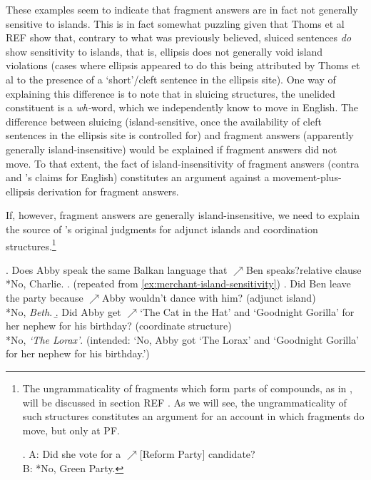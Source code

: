 \documentclass[11pt,letterpaper]{article}
\begin{document}
%
% 
		
These examples seem to indicate that fragment answers are in fact not generally sensitive to islands. This is in fact somewhat puzzling given that Thoms et al REF %
show that, contrary to what was previously believed, sluiced sentences \emph{do} show sensitivity to islands, that is, ellipsis does not generally void island violations (cases where ellipsis appeared to do this being attributed by Thoms et al %
to the presence of a `short'/cleft sentence in the ellipsis site). One way of explaining this difference is to note that in sluicing structures, the unelided constituent is a {\it wh-}word, which we independently know to move in English. The difference between sluicing (island-sensitive, once the availability of cleft sentences in the ellipsis site is controlled for) and fragment answers (apparently generally island-insensitive) would be explained if fragment answers did not move. To that extent, the fact of island-insensitivity of fragment answers (contra \cite{Me04} and \cite{Te13}'s claims for English) constitutes an argument against a movement-plus-ellipsis derivation for fragment answers. %

If, however, fragment answers are generally island-insensitive, we need to explain the source of \cite{Me04}'s original judgments for adjunct islands and coordination structures.\footnote{The ungrammaticality of fragments which form parts of compounds, as in \Next, will be discussed in section REF %
. As we will see, the ungrammaticality of such structures constitutes an argument for an account in which fragments do move, but only at PF.

\ex.	A: Did she vote for a $\nearrow$[Reform Party] candidate?\\
	B: *No, Green Party.
	
}

\ex. 	Does Abby speak the same Balkan language that $\nearrow$Ben speaks?\hfill{relative clause}\\
	{}*No, Charlie.
\ex. 	(repeated from \ref{ex:merchant-island-sensitivity})
	\a. Did Ben leave the party because $\nearrow$Abby wouldn't dance with him? \hfill (adjunct island)\\
	{}*No, \emph{Beth}.
	\b. Did Abby get $\nearrow$`The Cat in the Hat' and `Goodnight Gorilla' for her nephew for his birthday? \hfill (coordinate structure)\\
	{}*No, \emph{`The Lorax'}. (intended: `No, Abby got `The Lorax' and `Goodnight Gorilla' for her nephew for his birthday.')
\end{document}
